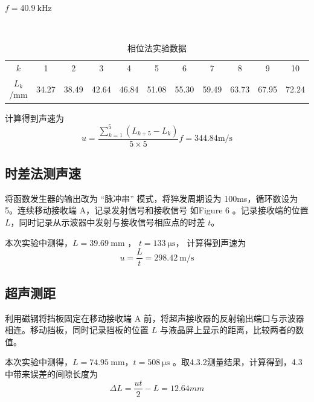 \documentclass[12pt]{article}
\begin{document}
\begin{table}[H]
\centering
\caption{相位法实验数据}
\vspace{2pt} 
\begin{minipage}{0.7\textwidth}
        \raggedleft
        $f= 40.9\ \mathrm{kHz}$
    \end{minipage}\\[2pt]
\small
\begin{tabular}{ccccccccccc}
\hline\hline
$k$ & 1 & 2 & 3 & 4 & 5 & 6 & 7 & 8 & 9 & 10 \\ 
$L_k$/mm & 34.27 & 38.49 & 42.64 & 46.84 & 51.08 & 55.30 & 59.49 & 63.73 & 67.95 & 72.24 \\ 
\hline\hline
\end{tabular}
\end{table}

计算得到声速为
\begin{equation}
    u=\frac{\sum_{k=1}^{5}(L_{k+5}-L_k)}{5\times 5}f=344.84 \mathrm{m/s}
\end{equation}

\subsection{时差法测声速}
将函数发生器的输出改为 “脉冲串” 模式，将猝发周期设为 100ms，循环数设为 5。连续移动接收端 A，记录发射信号和接收信号 如Figure 6 。记录接收端的位置 $L$，同时记录从示波器中发射与接收信号相应点的时差 $t$。

本次实验中测得，$L=39.69\ \mathrm {mm}$ ， $t=133\ \mathrm{\mu s}$， 计算得到声速为
\begin{equation}
    u=\frac{L}{t}=298.42\ \mathrm{m/s}
\end{equation}

\subsection{超声测距}
利用磁钢将挡板固定在移动接收端 A 前，将超声接收器的反射输出端口与示波器相连。移动挡板，同时记录挡板的位置 $L$ 与液晶屏上显示的距离，比较两者的数值。

本次实验中测得，$L=74.95\ \mathrm{mm}$，$t=508\ \mathrm{\mu s}$ 。取4.3.2测量结果，计算得到，4.3中带来误差的间隙长度为
\begin{equation}
    \Delta L=\frac{ut}{2}-L=12.64mm
\end{equation}
\end{document}
